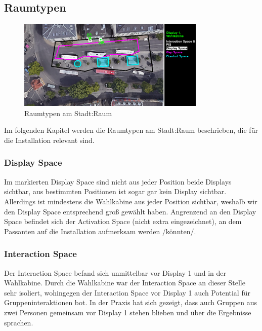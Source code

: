 \subsection{Raumtypen}\label{raumtypen}

\begin{figure}[ht]
    \centering
    \includegraphics[width=0.8\textwidth]{figures/raumtypen.pdf}
    \caption{Raumtypen am Stadt:Raum}
    \label{fig:raumtypen}
\end{figure}

Im folgenden Kapitel werden die Raumtypen \cite{raumtypen} am Stadt:Raum beschrieben, die für die Installation relevant sind.

\subsubsection{Display Space}\label{display-space}

Im markierten Display Space sind nicht aus jeder Position beide Displays sichtbar, aus bestimmten Positionen ist sogar gar kein Display sichtbar.
Allerdings ist mindestens die Wahlkabine aus jeder Position sichtbar, weshalb wir den Display Space entsprechend groß gewählt haben.
Angrenzend an den Display Space befindet sich der Activation Space (nicht extra eingezeichnet), an dem Passanten auf die Installation aufmerksam werden /könnten/.

\subsubsection{Interaction Space}\label{interaction-space}

Der Interaction Space befand sich unmittelbar vor Display 1 und in der Wahlkabine.
Durch die Wahlkabine war der Interaction Space an dieser Stelle sehr isoliert, wohingegen der Interaction Space vor Display 1 auch Potential für Gruppeninteraktionen bot.
In der Praxis hat sich gezeigt, dass auch Gruppen aus zwei Personen gemeinsam vor Display 1 stehen blieben und über die Ergebnisse sprachen.

